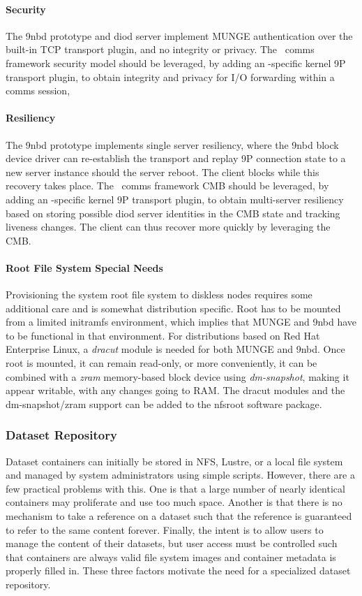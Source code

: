 \paragraph{Security}
The 9nbd prototype and diod server implement MUNGE authentication
over the built-in TCP transport plugin, and no integrity or privacy.
The \ngrm\ comms framework security model should be leveraged,
by adding an \ngrm-specific kernel 9P transport plugin,
to obtain integrity and privacy for I/O forwarding within a comms session,

\paragraph{Resiliency}
The 9nbd prototype implements single server resiliency, where the
9nbd block device driver can re-establish the transport and replay
9P connection state to a new server instance should the server reboot.
The client blocks while this recovery takes place.
The \ngrm\ comms framework CMB should be leveraged,
by adding an \ngrm-specific kernel 9P transport plugin,
to obtain multi-server resiliency based on storing possible diod server
identities in the CMB state and tracking liveness changes.
The client can thus recover more quickly by leveraging the CMB.

\paragraph{Root File System Special Needs}
Provisioning the system root file system to diskless nodes requires
some additional care and is somewhat distribution specific.
Root has to be mounted from a limited initramfs environment, which
implies that MUNGE and 9nbd have to be functional in that environment.
For distributions based on Red Hat Enterprise Linux, a {\em dracut}
module is needed for both MUNGE and 9nbd.  Once root is mounted, it can
remain read-only, or more conveniently, it can be combined with a {\em zram}
memory-based block device using {\em dm-snapshot}, making it appear
writable, with any changes going to RAM.  The dracut modules and the
dm-snapshot/zram support can be added to the nfsroot\cite{nfsroot}
software package.

\subsubsection{Dataset Repository}

Dataset containers can initially be stored in NFS, Lustre, or a local file
system and managed by system administrators using simple scripts.
However, there are a few practical problems with this.
One is that a large number of nearly identical containers may proliferate
and use too much space.  Another is that there is no mechanism to take a
reference on a dataset such that the reference is guaranteed to refer to
the same content forever.
Finally, the intent is to allow users to manage the content of their datasets,
but user access must be controlled such that containers are always
valid file system images and container metadata is properly filled in.
These three factors motivate the need for a specialized dataset repository.

